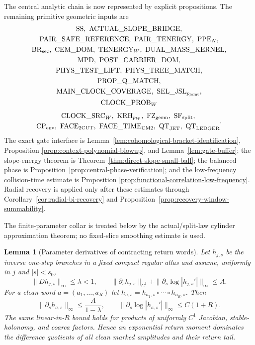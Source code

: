 \documentclass[11pt]{article}
\newtheorem{lemma}[theorem]{Lemma}
\begin{document}
The central analytic chain is now represented by explicit propositions.
The remaining primitive geometric inputs are
\[
 \begin{gathered}
 \mathrm{SS},\ \mathrm{ACTUAL\_SLOPE\_BRIDGE},\\
 \mathrm{PAIR\_SAFE\_REFERENCE},\ \mathrm{PAIR\_TENERGY},\
 \mathrm{PPE}_{N},\\
 \mathrm{BR}_{\rm sec},\ \mathrm{CEM\_DOM},\
 \mathrm{TENERGY}_{W},\ \mathrm{DUAL\_MASS\_KERNEL},\\
 \mathrm{MPD},\ \mathrm{POST\_CARRIER\_DOM},\\
 \mathrm{PHYS\_TEST\_LIFT},\ \mathrm{PHYS\_TREE\_MATCH},\\
 \mathrm{PROP\_Q\_MATCH},\\
 \mathrm{MAIN\_CLOCK\_COVERAGE},\
 \mathrm{SEL\_JSL}_{p_{\rm joint}},\\
 \mathrm{CLOCK\_PROB}_{W}
 \end{gathered}
\]
\[
 \begin{gathered}
 \mathrm{CLOCK\_SRC}_{W},\ \mathrm{KRH}_{p_W},\
 \mathrm{FZ}_{\rm geom},\ \mathrm{SF}_{\rm split},\\
 \mathrm{CP}_{\rm env},\ \mathrm{FACE}_{\rm 2CUT},\
 \mathrm{FACE\_TIME}_{\rm CM2},\
 \mathrm{QT}_{\rm JET},\ \mathrm{QT}_{\rm LEDGER}
 \end{gathered}.
\]
The exact gate interface is
Lemma~\ref{lem:cohomological-bracket-identification}, Proposition
\ref{prop:context-polynomial-blowup}, and Lemma~\ref{lem:gate-buffer}; the
slope-energy theorem is Theorem~\ref{thm:direct-slope-small-ball}; the
balanced phase is Proposition~\ref{prop:central-phase-verification}; and the
low-frequency collision-time estimate is Proposition
\ref{prop:functional-correlation-low-frequency}.  Radial recovery is applied
only after these estimates through Corollary~\ref{cor:radial-bi-recovery} and
Proposition~\ref{prop:recovery-window-summability}.

The finite-parameter collar is treated below by the actual/split-law cylinder
approximation theorem; no fixed-slice smoothing estimate is used.

\begin{lemma}[Parameter derivatives of contracting return words]
\label{lem:parametric-inverse-word}
Let $h_{j,s}$ be the inverse one-step branches in a fixed compact regular
atlas and assume, uniformly in $j$ and $|s|<s_0$,
\[
 \|Dh_{j,s}\|_\infty\le\lambda<1,
 \qquad
 \|\partial_sh_{j,s}\|_{C^1}
 +\|\partial_s\log|h_{j,s}'|\|_\infty\le A.
\]
For a clean word $a=(a_1,\ldots,a_R)$ let
$h_{a,s}=h_{a_1,s}\circ\cdots\circ h_{a_R,s}$.  Then
\begin{equation}
\label{eq:parametric-word-bounds}
 \|\partial_s h_{a,s}\|_\infty\le \frac{A}{1-\lambda},
 \qquad
 \|\partial_s\log|h_{a,s}'|\|_\infty\le C(1+R).
\end{equation}
The same linear-in-$R$ bound holds for products of uniformly $C^1$
Jacobian, stable-holonomy, and coarea factors.  Hence an exponential return
moment dominates the difference quotients of all clean marked amplitudes and
their return tail.
\end{lemma}
\end{document}
